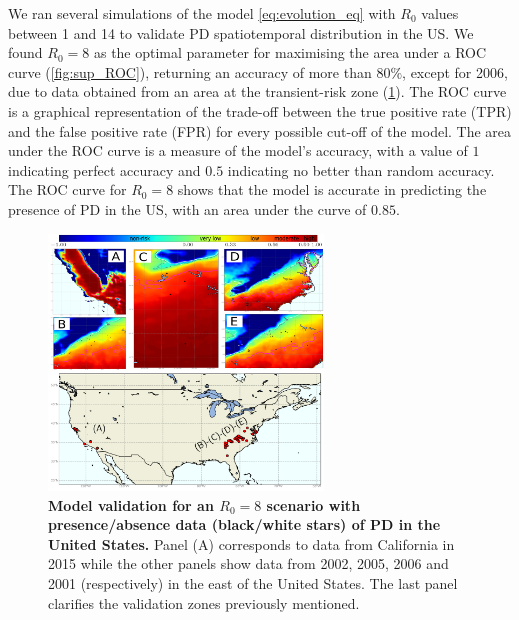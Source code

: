 We ran several simulations of the model \cref{eq:evolution_eq} with $R_0$
values between 1 and 14 to validate PD spatiotemporal distribution in the
US.
We found $R_0=8$ as the optimal parameter for maximising the area under a
ROC
curve (\cref{fig:sup_ROC}), returning an accuracy of more than $80 \%$,
except for 2006, due to data obtained from an area at the transient-risk
zone
(\cref{fig:sup_validation}). The ROC curve is a graphical representation of
the trade-off between the true positive rate (TPR) and the false positive
rate (FPR) for every possible cut-off of the model. The area under the ROC
curve is a measure of the model's accuracy, with a value of $1$ indicating
perfect accuracy and $0.5$ indicating no better than random accuracy. The
ROC curve for $R_0=8$ shows that the model is accurate in predicting the
presence of PD in the US, with an area under the curve of $0.85$.

\begin{figure}[H]
    \centering
    \includegraphics[width=0.65\textwidth]{Figures/validation.png}
    \caption{\textbf{Model validation for an $R_0=8$ scenario with
            presence/absence data (black/white stars) of PD in the United
            States.} Panel
        (A) corresponds to data from California in 2015 while the other
        panels
        show
        data from 2002, 2005, 2006 and 2001 (respectively) in the east of
        the
        United
        States. The last panel clarifies the validation zones previously
        mentioned.}
    \label{fig:sup_validation} %
\end{figure}

